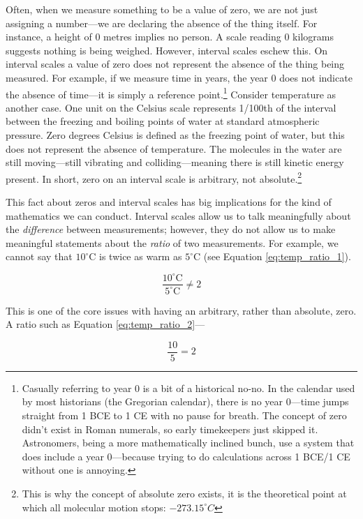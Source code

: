 Often, when we measure something to be a value of zero, we are not just assigning a number—we are declaring the absence of the thing itself. For instance, a height of 0 metres implies no person. A scale reading 0 kilograms suggests nothing is being weighed. However, interval scales eschew this. On interval scales a value of zero does not represent the absence of the thing being measured. For example, if we measure time in years, the year 0 does not indicate the absence of time—it is simply a reference point.\footnote{Casually referring to year 0 is a bit of a historical no-no. In the calendar used by most historians (the Gregorian calendar), there is no year 0—time jumps straight from 1 BCE to 1 CE with no pause for breath. The concept of zero didn’t exist in Roman numerals, so early timekeepers just skipped it. Astronomers, being a more mathematically inclined bunch, use a system that does include a year 0—because trying to do calculations across 1 BCE/1 CE without one is annoying.} Consider temperature as another case. One unit on the Celsius scale represents 1/100th of the interval between the freezing and boiling points of water at standard atmospheric pressure. Zero degrees Celsius is defined as the freezing point of water, but this does not represent the absence of temperature. The molecules in the water are still moving—still vibrating and colliding—meaning there is still kinetic energy present. In short, zero on an interval scale is arbitrary, not absolute.\footnote{This is why the concept of absolute zero exists, it is the theoretical point at which all molecular motion stops: $−273.15^\circ C$}

This fact about zeros and interval scales has big implications for the kind of mathematics we can conduct. Interval scales allow us to talk meaningfully about the \textit{difference} between measurements; however, they do not allow us to make meaningful statements about the \textit{ratio} of two measurements. For example, we cannot say that $10^\circ$C is twice as warm as $5^\circ$C (see Equation \ref{eq:temp_ratio_1}).

\begin{equation}
\frac{10^\circ \text{C}}{5^\circ \text{C}} \neq 2
\label{eq:temp_ratio_1}
\end{equation}

\noindent
This is one of the core issues with having an arbitrary, rather than absolute, zero. A ratio such as Equation \ref{eq:temp_ratio_2}—

\begin{equation}
\frac{10}{5} = 2
\label{eq:temp_ratio_2}
\end{equation}

